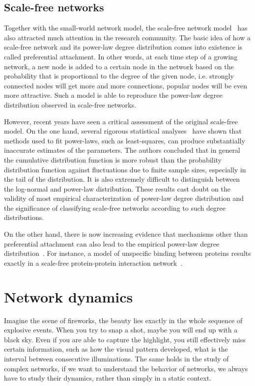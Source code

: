 \subsection{Scale-free networks}
\label{sec:scale_free}
Together with the small-world network model, the scale-free network model~%
\citep{Barabasi1999} has
also attracted much attention in the research community. The basic idea of 
how a scale-free network and its power-law degree distribution comes into
existence is called preferential attachment. In other words, at each time
step of a growing network, a new node is added to a certain node in the 
network based on the probability that is proportional to the degree of the
given node, i.e. strongly connected nodes will get more and more connections,
popular nodes will be even more attractive. Such a model is able to reproduce
the power-law degree distribution observed in scale-free networks.

However, recent years have seen a critical assessment of the original 
scale-free model. On the one hand, several rigorous statistical analyses~%
\citep{Clauset2009,Khanin2006a} have shown that methods used to fit power-laws, such as 
least-squares, can produce substantially inaccurate estimates of the 
parameters. The authors concluded that in general the cumulative distribution
function is more robust than the probability distribution function against 
fluctuations due to finite sample sizes, especially in the tail of the 
distribution. It is also extremely difficult to distinguish between
the log-normal and power-law distribution. These results cast doubt on the
validity of most empirical characterization of power-law degree distribution
and the significance of classifying scale-free networks according to such
degree distributions.

On the other hand, there is now increasing evidence that mechanisms other than
preferential attachment can also lead to the empirical power-law degree 
distribution~\citep{Caldarelli2002}. For instance, a model of unspecific 
binding between proteins results exactly in a scale-free protein-protein 
interaction network~\citep{Deeds2006}.

\section{Network dynamics}
Imagine the scene of fireworks, the beauty lies exactly in the whole sequence 
of explosive events. When you try to snap a shot, maybe you will end up with
a black sky. Even if you are able to capture the highlight, you still 
effectively miss certain information, such as how the visual pattern developed,
what is the interval between consecutive illuminations. The same holds in the
study of complex networks, if we want to understand the behavior of networks,
we always have to study their dynamics, rather than simply in a static context.

